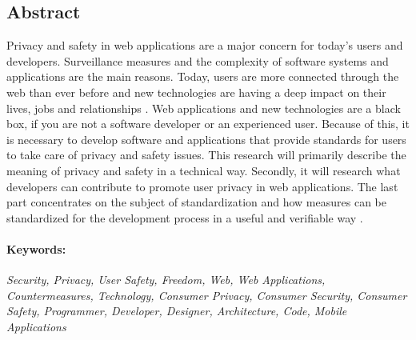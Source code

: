 \subsection*{Abstract} 
Privacy and safety in web applications are a major concern for today's users and developers. Surveillance measures and the complexity of software systems and applications are the main reasons. Today, users are more connected through the web than ever before and new technologies are having a deep impact on their lives, jobs and relationships \cite{javaid2013cyber}. Web applications and new technologies are a black box, if you are not a software developer or an experienced user. Because of this, it is necessary to develop software and applications that provide standards for users to take care of privacy and safety issues. This research will primarily describe the meaning of privacy and safety in a technical way. Secondly, it will research what developers can contribute to promote user privacy in web applications. The last part concentrates on the subject of standardization and how measures can be standardized for the development process in a useful and verifiable way \cite{defranco2013every}.
\paragraph{Keywords:}
\textit{Security, Privacy, User Safety, Freedom, Web, Web Applications, Countermeasures, Technology, Consumer Privacy, Consumer Security, Consumer Safety, Programmer, Developer, Designer, Architecture, Code, Mobile Applications}